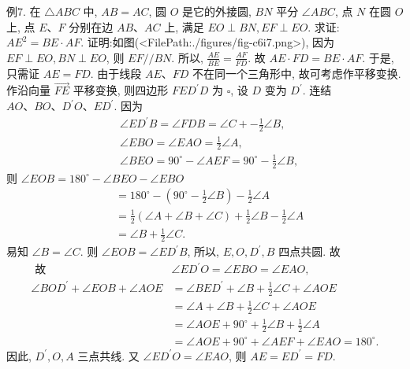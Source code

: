 例7. 在 $\triangle A B C$ 中, $A B=A C$, 圆 $O$ 是它的外接圆, $B N$ 平分 $\angle A B C$, 点 $N$ 在圆 $O$ 上, 点 $E 、 F$ 分别在边 $A B 、 A C$ 上, 满足 $E O \perp B N, E F \perp E O$. 求证: $A E^2= B E \cdot A F$.
证明:如图(<FilePath:./figures/fig-c6i7.png>), 因为 $E F \perp E O, B N \perp E O$, 则 $E F / / B N$.
所以, $\frac{A E}{B E}=\frac{A F}{F D}$.
故 $A E \cdot F D=B E \cdot A F$.
于是, 只需证 $A E=F D$.
由于线段 $A E 、 F D$ 不在同一个三角形中, 故可考虑作平移变换.
作沿向量 $\overrightarrow{F E}$ 平移变换, 则四边形 $F E D^{\prime} D$ 为 $\square$, 设 $D$ 变为 $D^{\prime}$.
连结 $A O 、 B O 、 D^{\prime} O 、 E D^{\prime}$. 因为
$$
\begin{aligned}
& \angle E D^{\prime} B=\angle F D B=\angle C+-\frac{1}{2} \angle B, \\
& \angle E B O=\angle E A O=\frac{1}{2} \angle A, \\
& \angle B E O=90^{\circ}-\angle A E F=90^{\circ}-\frac{1}{2} \angle B,
\end{aligned}
$$
则 $\angle E O B=180^{\circ}-\angle B E O-\angle E B O$
$$
\begin{aligned}
& =180^{\circ}-\left(90^{\circ}-\frac{1}{2} \angle B\right)-\frac{1}{2} \angle A \\
& =\frac{1}{2}(\angle A+\angle B+\angle C)+\frac{1}{2} \angle B-\frac{1}{2} \angle A \\
& =\angle B+\frac{1}{2} \angle C .
\end{aligned}
$$
易知 $\angle B=\angle C$.
则 $\angle E O B=\angle E D^{\prime} B$, 所以, $E, O, D^{\prime}, B$ 四点共圆.
故
$$
\begin{aligned}
\text { 故 } & \angle E D^{\prime} O=\angle E B O=\angle E A O, \\
\angle B O D^{\prime}+\angle E O B+\angle A O E & =\angle B E D^{\prime}+\angle B+\frac{1}{2} \angle C+\angle A O E \\
& =\angle A+\angle B+\frac{1}{2} \angle C+\angle A O E \\
& =\angle A O E+90^{\circ}+\frac{1}{2} \angle B+\frac{1}{2} \angle A \\
& =\angle A O E+90^{\circ}+\angle A E F+\angle E A O=180^{\circ} .
\end{aligned}
$$
因此, $D^{\prime}, O, A$ 三点共线.
又 $\angle E D^{\prime} O=\angle E A O$, 则 $A E=E D^{\prime}=F D$.



